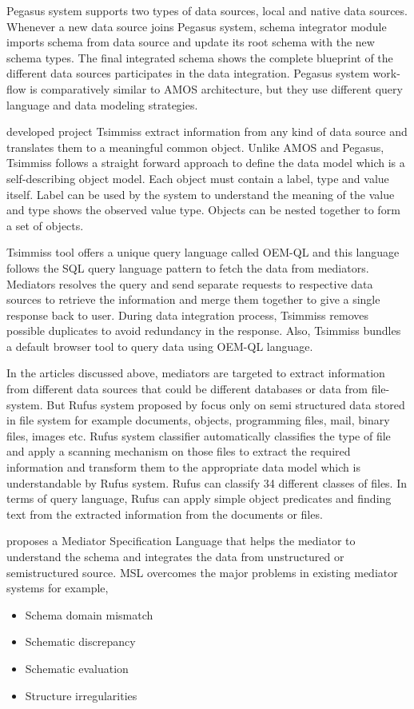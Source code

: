 \documentclass[12pt]{article}
\begin{document}
Pegasus system supports two types of data sources, local and native data sources. Whenever a new data source joins Pegasus system, schema integrator module imports schema from data source and update its root schema with the new schema types. The final integrated schema shows the complete blueprint of the different data sources participates in the data integration. Pegasus system work-flow is comparatively similar to AMOS architecture, but they use different query language and data modeling strategies.

\citet{chawathe1994tsimmis} developed project Tsimmiss extract information from any kind of data source and translates them to a meaningful common object. Unlike AMOS and Pegasus, Tsimmiss follows a straight forward approach to define the data model which is a self-describing object model. Each object must contain a label, type and value itself. Label can be used by the system to understand the meaning of the value and type shows the observed value type. Objects can be nested together to form a set of objects. 

Tsimmiss tool offers a unique query language called OEM-QL and this language follows the SQL query language pattern to fetch the data from mediators. Mediators resolves the query and send separate requests to respective data sources to retrieve the information and merge them together to give a single response back to user. During data integration process, Tsimmiss removes possible duplicates to avoid redundancy in the response. Also, Tsimmiss bundles a default browser tool to query data using OEM-QL language.

In the articles discussed above, mediators are targeted to extract information from different data sources that could be different databases or data from file-system. But Rufus system proposed by \citet{shoens1993rufus} focus only on semi structured data stored in file system for example documents, objects, programming files, mail, binary files, images etc. Rufus system classifier automatically classifies the type of file and apply a scanning mechanism on those files to extract the required information and transform them to the appropriate data model which is understandable by Rufus system. Rufus can classify 34 different classes of files. In terms of query language, Rufus can apply simple object predicates and finding text from the extracted information from the documents or files.

\citet{papakonstantinou1996medmaker} proposes a Mediator Specification Language that helps the mediator to understand the schema and integrates the data from unstructured or semistructured source. MSL overcomes the major problems in existing mediator systems for example,
\begin{itemize}
	\item Schema domain mismatch 
	\item Schematic discrepancy
	\item Schematic evaluation
	\item Structure irregularities
\end{itemize}
\end{document}
